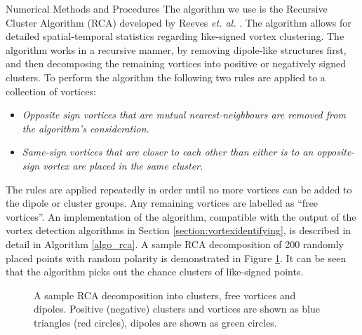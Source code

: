 \begin{chapter}{\label{cha:numerics}Numerical Methods and Procedures}
The algorithm we use is the Recursive Cluster Algorithm (RCA) developed by Reeves {\it et. al.} \cite{reeves_billam_13, reeves}. The algorithm allows for detailed spatial-temporal statistics regarding like-signed vortex clustering. The algorithm works in a recursive manner, by removing dipole-like structures first, and then decomposing the remaining vortices into positive or negatively signed clusters. To perform the algorithm the following two rules are applied to a collection of vortices:
\begin{itemize}
\item {\it Opposite sign vortices that are mutual nearest-neighbours are removed from the algorithm's consideration.}
\item {\it Same-sign vortices that are closer to each other than either is to an opposite-sign vortex are placed in the same cluster.}
\end{itemize}
The rules are applied repeatedly in order until no more vortices can be added to the dipole or cluster groups. Any remaining vortices are labelled as ``free vortices''. An implementation of the algorithm, compatible with the output of the vortex detection algorithms in Section \ref{section:vortexidentifying}, is described in detail in Algorithm \ref{algo_rca}. A sample RCA decomposition of 200 randomly placed points with random polarity is demonstrated in Figure \ref{fig:rca}. It can be seen that the algorithm picks out the chance clusters of like-signed points. 

\begin{figure}
\centering
\caption{A sample RCA decomposition into clusters, free vortices and dipoles. Positive (negative) clusters and vortices are shown as blue triangles (red circles), dipoles are shown as green circles.}\label{fig:rca}
\end{figure}


\end{chapter}
